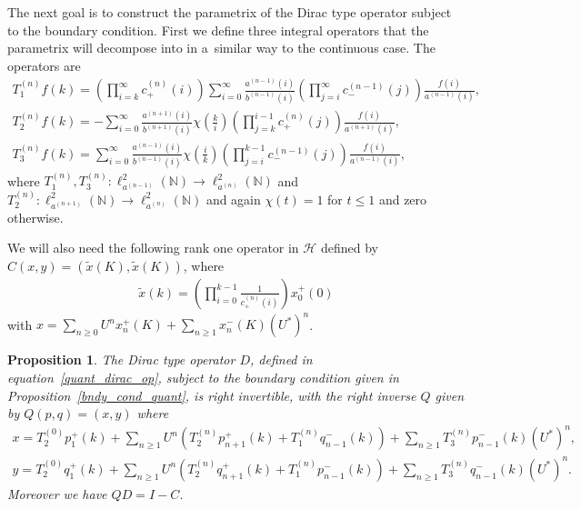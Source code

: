 \documentclass[pdftex]{sigma}
\numberwithin{equation}{section}
\newtheorem{prop}[theo]{Proposition}
{\theoremstyle{definition}
\newtheorem{rem}[theo]{Remark}
\newtheorem{defin}[theo]{Definition}
}
\begin{document}
The next goal is to construct the parametrix of the Dirac type operator subject to the boundary condition.
First we def\/ine three integral operators that the parametrix will decompose into in a~similar way to the continuous
case.
The operators are
\begin{gather}
T_1^{(n)}f(k) = \left(\prod\limits_{i=k}^\infty c_+^{(n)}(i)\right)\sum\limits_{i=0}^\infty
\frac{a^{(n-1)}(i)}{b^{(n-1)}(i)}\left(\prod\limits_{j=i}^\infty c_-^{(n-1)}(j)\right)\frac{f(i)}{a^{(n-1)}(i)},
\nonumber
\\
T_2^{(n)}f(k) = -\sum\limits_{i=0}^\infty\frac{a^{(n+1)}(i)}{b^{(n+1)}(i)}\chi\left(\frac{k}{i}\right)
\left(\prod\limits_{j=k}^{i-1}c_+^{(n)}(j)\right)\frac{f(i)}{a^{(n+1)}(i)},
\nonumber
\\
T_3^{(n)}f(k) = \sum\limits_{i=0}^\infty
\frac{a^{(n-1)}(i)}{b^{(n-1)}(i)}\chi\left(\frac{i}{k}\right)\left(\prod\limits_{j=i}^{k-1}c_-^{(n-1)}(j)\right)\frac{f(i)}{a^{(n-1)}(i)},
\label{int_ops_quant}
\end{gather}
where $T_1^{(n)}, T_3^{(n)}: \ell_{a^{(n-1)}}^2({\mathbb N})\to\ell_{a^{(n)}}^2({\mathbb N})$ and $T_2^{(n)}:
\ell_{a^{(n+1)}}^2({\mathbb N}) \to \ell_{a^{(n)}}^2({\mathbb N})$ and again $\chi(t)=1$ for $t\le1$ and zero otherwise.

We will also need the following rank one operator in $\mathcal{H}$ def\/ined by $C(x,y) = (\tilde x(K),\tilde x(K))$,
where
\begin{gather*}
\tilde x(k) = \left(\prod\limits_{i=0}^{k-1}\frac{1}{c_+^{(n)}(i)}\right)x_0^+(0)
\end{gather*}
with $x= \sum\limits_{n\ge0} U^n x_n^+(K) + \sum\limits_{n\ge1} x_n^-(K)(U^*)^n$.

\begin{prop}
\label{quant_para}
The Dirac type operator $D$, defined in equation~\eqref{quant_dirac_op}, subject to the boundary condition given in
Proposition~{\rm \ref{bndy_cond_quant}}, is right invertible, with the right inverse $Q$ given by $Q(p,q)=({x},{y})$ where
\begin{gather*}
{x} = T_2^{(0)}p_1^+(k) + \sum\limits_{n\ge 1}U^n\left(T_2^{(n)}p_{n+1}^+(k) + T_1^{(n)}q_{n-1}^-(k)\right) +
\sum\limits_{n\ge1} T_3^{(n)}p_{n-1}^-(k)(U^*)^n,
\\
{y} = T_2^{(0)}q_1^+(k) + \sum\limits_{n\ge 1}U^n\left(T_2^{(n)}q_{n+1}^+(k) + T_1^{(n)}p_{n-1}^-(k)\right) +
\sum\limits_{n\ge1} T_3^{(n)}q_{n-1}^-(k)(U^*)^n.
\end{gather*}
Moreover we have $QD = I - C$.
\end{prop}
\end{document}
